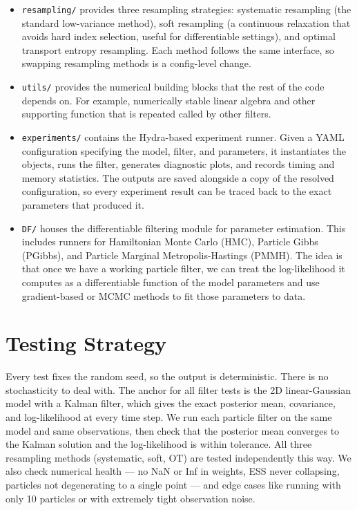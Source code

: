 \documentclass{article}
\begin{document}
\begin{itemize}
    \item \texttt{resampling/} provides three resampling strategies: systematic resampling (the standard low-variance method), soft resampling (a continuous relaxation that avoids hard index selection, useful for differentiable settings), and optimal transport entropy resampling. Each method follows the same interface, so swapping resampling methods is a config-level change.
    \item \texttt{utils/} provides the numerical building blocks that the rest of the code depends on. For example, numerically stable linear algebra and other supporting function that is repeated called by other filters.
      \item \texttt{experiments/} contains the Hydra-based experiment runner. Given a YAML configuration specifying the model, filter, and parameters, it instantiates the objects, runs the filter, generates diagnostic plots, and records timing and memory statistics. The outputs are saved alongside a copy of the resolved configuration, so every experiment result can be traced back to the exact parameters that produced it.
    \item \texttt{DF/} houses the differentiable filtering module for parameter estimation. This includes runners for Hamiltonian Monte Carlo (HMC), Particle Gibbs (PGibbs), and Particle Marginal Metropolis-Hastings (PMMH). The idea is that once we have a working particle filter, we can treat the log-likelihood it computes as a differentiable function of the model parameters and use gradient-based or MCMC methods to fit those parameters to data.
\end{itemize}

\section{Testing Strategy}\label{app:testing}



Every test fixes the random seed, so the output is deterministic. There is no stochasticity to deal with. The anchor for all filter tests is the 2D linear-Gaussian model with a Kalman filter, which gives the exact posterior mean, covariance, and log-likelihood at every time step. We run each particle filter on the same model and same observations, then check that the posterior mean converges to the Kalman solution and the log-likelihood is within tolerance. All three resampling methods (systematic, soft, OT) are tested independently this way. We also check numerical health --- no NaN or Inf in weights, ESS never collapsing, particles not degenerating to a single point --- and edge cases like running with only 10 particles or with extremely tight observation noise.
\end{document}
